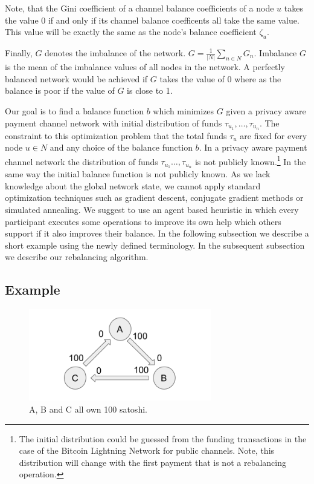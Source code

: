 \documentclass[a4paper]{paper}
\begin{document}
Note, that the Gini coefficient of a channel balance coefficients of a node $u$ takes the value $0$ if and only if its channel balance coefficents all take the same value.
This value will be exactly the same as the node's balance coefficient $\zeta_u$.

Finally, $G$ denotes the imbalance of the network. $G = \displaystyle{\frac{1}{|N|}\sum_{n\in N}G_n}$. Imbalance $G$ is the mean of the imbalance values of all nodes in the network.
A perfectly balanced network would be achieved if $G$ takes the value of $0$ where as the balance is poor if the value of $G$ is close to 1.

Our goal is to find a balance function $b$ which minimizes $G$ given a privacy aware payment channel network with initial distribution of funds $\tau_{u_1},\dots,\tau_{u_n}$.
The constraint to this optimization problem that the total funds $\tau_u$ are fixed for every node $u \in N$ and any choice of the balance function $b$.
In a privacy aware payment channel network the distribution of funds $\tau_{u_1}\dots,\tau_{u_n}$ is not publicly known.\footnote{The initial distribution could be guessed from the funding transactions in the case of the Bitcoin Lightning Network for public channels. Note, this distribution will change with the first payment that is not a rebalancing operation.}
In the same way the initial balance function is not publicly known.
As we lack knowledge about the global network state, we cannot apply standard optimization techniques such as gradient descent, conjugate gradient methods or simulated annealing.
We suggest to use an agent based heuristic in which every participant executes some operations to improve its own help which others support if it also improves their balance.
In the following subsection we describe a short example using the newly defined terminology. In the subsequent subsection we describe our rebalancing algorithm.


\subsection{Example}
\label{sec:example}

\begin{figure}
 \centering
 \includegraphics[width=8cm]{img/evenUnbalanced.png}
 \caption{A, B and C all own 100 satoshi.}
 \label{fig:evenUnbalanced}
\end{figure}
\end{document}
